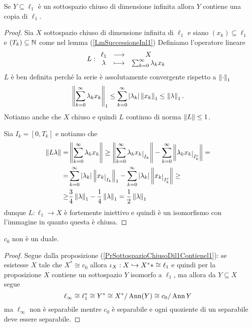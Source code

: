 \begin{proposition}[]\label{PrSottospazioChiusoDil1Contienel1}
Se $Y\subseteq \ell_1$ \`e un sottospazio chiuso di dimensione infinita allora $Y$ contiene una copia di $\ell_1$.

\end{proposition}
\begin{proof}
Sia $X$ sottospazio chiuso di dimensione infinita di $\ell_1$ e siano $(x_k)\subseteq \ell_1$ e $(T_k)\subseteq \mathbb{N}$ come nel lemma (\ref{LmSuccessioneInl1}) Definiamo l'operatore lineare
\[L:\begin{array}{ccc} {\ell_1} & \longrightarrow & {X}\\ {\lambda} & \longmapsto & {\sum_{k=0}^\infty\lambda_k x_k} \end{array}\]
$L$ \`e ben definita perch\'e la serie \`e assolutamente convergente rispetto a $\left\Vert{\cdot}\right\Vert_1$
\[\left\Vert{\sum_{k=0}^\infty\lambda_k x_k}\right\Vert_1\leq \sum_{k=0}^\infty\left|{\lambda_k}\right| \left\Vert{x_k}\right\Vert_1\leq \left\Vert{\lambda}\right\Vert_1.\]
Notiamo anche che $X$ chiuso e quindi $L$ continuo di norma $\left\Vert{L}\right\Vert\leq 1$.

Sia $I_k=[0,T_k]$ e notiamo che
\begin{align*}
\norm{L\la}=&\norm{\sum_{k=0}^\infty\la_k x_k}\geq\norm{\sum_{k=0}^\infty\la_k x_k\res{I_k}}-\sum_{k=0}^\infty\norm{\la_k x_k\res{I_k^c}}=\\
=&\sum_{k=0}^\infty\abs{\la_k} \norm{x_k\res{I_k}}_1-\sum_{k=0}^\infty\abs{\la_k} \norm{x_k\res{I_k^c}}\geq\\
\geq&\frac34\norm\la_1-\frac14\norm{\la}_1=\frac12\norm\la_1
\end{align*}
dunque $L:\ell_1\to X$ \`e fortemente iniettivo e quindi \`e un isomorfismo con l'immagine in quanto questa \`e chiusa.
\end{proof}


\begin{exercise}
$c_0$ non \`e un duale.
\end{exercise}
\begin{proof}
Segue dalla proposizione (\ref{PrSottospazioChiusoDil1Contienel1}): se esistesse $X$ tale che $X^\ast\cong c_0$ allora $\iota_X:X\hookrightarrow X^\ast\ast\cong \ell_1$ e quindi per la proposizione $X$ contiene un sottospazio $Y$ isomorfo a $\ell_1$, ma allora da $Y\subseteq X$ segue 
\[\ell_\infty\cong \ell_1^\ast\cong Y^\ast\cong X^\ast/\operatorname{Ann}(Y)\cong c_0/\operatorname{Ann} Y\]
ma $\ell_\infty$ non \`e separabile mentre $c_0$ \`e separabile e ogni quoziente di un separabile deve essere separabile.
\end{proof}


